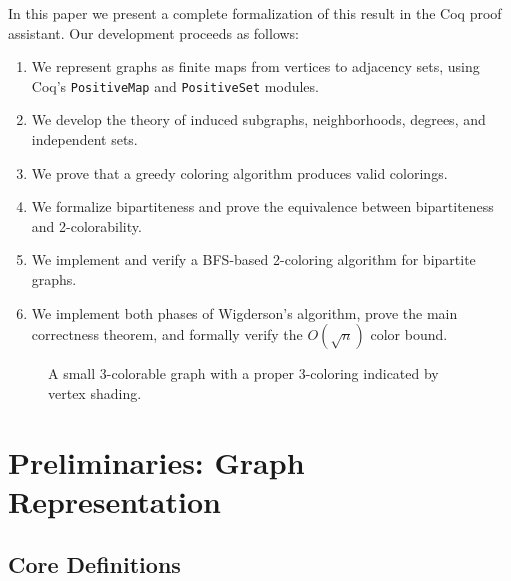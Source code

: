\documentclass[11pt]{article}
\theoremstyle{plain}
\theoremstyle{definition}
\theoremstyle{remark}
\begin{document}
In this paper we present a complete formalization of this result in the Coq proof assistant.
Our development proceeds as follows:
\begin{enumerate}[nosep]
  \item We represent graphs as finite maps from vertices to adjacency sets, using Coq's \texttt{PositiveMap} and \texttt{PositiveSet} modules.
  \item We develop the theory of induced subgraphs, neighborhoods, degrees, and independent sets.
  \item We prove that a greedy coloring algorithm produces valid colorings.
  \item We formalize bipartiteness and prove the equivalence between bipartiteness and 2-colorability.
  \item We implement and verify a BFS-based 2-coloring algorithm for bipartite graphs.
  \item We implement both phases of Wigderson's algorithm, prove the main correctness theorem, and formally verify the $O(\!\sqrt{n})$ color bound.
\end{enumerate}

\begin{figure}[ht]
\centering
{}
\caption{A small 3-colorable graph with a proper 3-coloring indicated by vertex shading.}
\label{fig:3coloring}
\end{figure}

\section{Preliminaries: Graph Representation}
\label{sec:prelim}

\subsection{Core Definitions}
\end{document}
